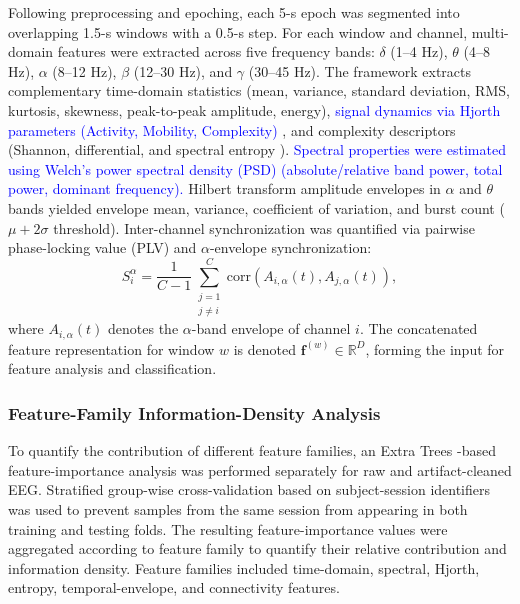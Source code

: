 \documentclass[conference]{IEEEtran}
\begin{document}
Following preprocessing and epoching, each 5-s epoch was segmented into overlapping 1.5-s windows with a 0.5-s step. For each window and channel, multi-domain features were extracted across five frequency bands: $\delta$ (1--4 Hz), $\theta$ (4--8 Hz), $\alpha$ (8--12 Hz), $\beta$ (12--30 Hz), and $\gamma$ (30--45 Hz).
The framework extracts complementary time-domain statistics (mean, variance, standard deviation, RMS, kurtosis, skewness, peak-to-peak amplitude, energy), \textcolor{blue}{signal dynamics via Hjorth parameters (Activity, Mobility, Complexity) \cite{safi2021early}}, and complexity descriptors (Shannon, differential, and spectral entropy \cite{zhang2018integration}). \textcolor{blue}{Spectral properties were estimated using Welch's power spectral density (PSD) (absolute/relative band power, total power, dominant frequency).} Hilbert transform amplitude envelopes \cite{o2017detecting} in $\alpha$ and $\theta$ bands yielded envelope mean, variance, coefficient of variation, and burst count ($\mu+2\sigma$ threshold). Inter-channel synchronization was quantified via pairwise phase-locking value (PLV) and $\alpha$-envelope synchronization:
\begin{equation}
S_i^{\alpha}
=
\frac{1}{C-1}
\sum_{\substack{j=1\\j\neq i}}^{C}
\mathrm{corr}\left(A_{i,\alpha}(t),A_{j,\alpha}(t)\right),
\end{equation}
where $A_{i,\alpha}(t)$ denotes the $\alpha$-band envelope of channel $i$. The concatenated feature representation for window $w$ is denoted $\mathbf{f}^{(w)} \in \mathbb{R}^D$, forming the input for feature analysis and classification.

\subsubsection{Feature-Family Information-Density Analysis}

To quantify the contribution of different feature families, an Extra Trees
\cite{geurts2006extremely}-based feature-importance analysis was performed
separately for raw and artifact-cleaned EEG. Stratified group-wise
cross-validation based on subject-session identifiers was used to prevent
samples from the same session from appearing in both training and testing
folds. The resulting feature-importance values were aggregated according to
feature family to quantify their relative contribution and information
density. Feature families included time-domain, spectral, Hjorth, entropy,
temporal-envelope, and connectivity features.
\end{document}
